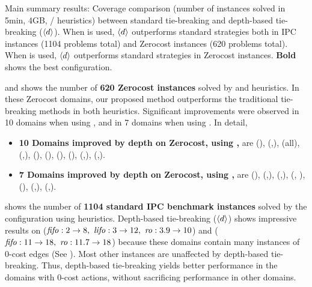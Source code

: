 \begin{table}[htb]
 {
 \centering
 \setlength{\tabcolsep}{3pt}
 
 \caption{
 Main summary results: Coverage comparison (number of instances solved in 5min, 4GB, \lmcut/\mands
 heuristics) between standard tie-breaking and depth-based tie-breaking
 (${\left<d\right>}$). When \lmcut is used, ${\left<d\right>}$ outperforms standard strategies both in IPC
 instances (1104 problems total) and Zerocost instances (620 problems
 total). When \mands is used, ${\left<d\right>}$ outperforms standard strategies
 in Zerocost instances. \textbf{Bold} shows the best configuration.}
 \label{tbl:depth-summary}
 }
\end{table}

 and  shows the number of \textbf{620 Zerocost
instances} solved by \lmcut and \mands heuristics. In these
Zerocost domains, our proposed method outperforms the traditional tie-breaking methods in both heuristics.
Significant improvements were observed in 10 domains when using \lmcut, and in 7 domains when using \mands.
In detail,
\begin{itemize}
 \item \textbf{10 Domains improved by depth on Zerocost, using \lmcut,} are  (\ro),  (\fifo,\ro),
        (all),  (\fifo,\ro),  (\ro),  (\ro),
        (\lifo),  (\fifo),  (\fifo,\ro),  (\fifo,\ro).
 \item \textbf{7 Domains improved by depth on Zerocost, using \mands,} are  (\ro),  (\fifo,\ro),
        (\fifo,\ro),  (\fifo, \ro),  (\ro),
        (\fifo,\ro),  (\fifo,\ro).
\end{itemize}

 shows the number of \textbf{1104 standard IPC benchmark instances} solved by the configuration using \lmcut
heuristics. Depth-based tie-breaking (${\left<d\right>}$) shows impressive results on  ($\fifo:2\to 8,\ \lifo:3\to 12,\  \ro:3.9\to 10$) and  (${\text{\textit{fifo}}}: 11\to 18,\ {\text{\textit{ro}}}: 11.7\to 18$) because these
domains contain many instances of 0-cost edges (See
).  Most other instances are unaffected by depth-based tie-breaking.  Thus, depth-based
tie-breaking yields better performance in the domains with 0-cost actions, without sacrificing performance in
other domains.

